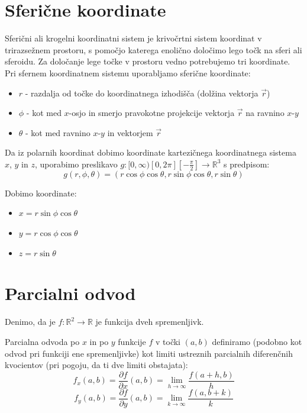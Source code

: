 \documentclass[12pt, a4paper]{article}
\begin{document}
\section{Sferične koordinate}

Sferični ali krogelni koordinatni sistem je krivočrtni sistem koordinat v trirazsežnem prostoru, s pomočjo katerega enolično določimo lego točk na sferi ali sferoidu. Za določanje lege točke v prostoru vedno potrebujemo tri koordinate. Pri sfernem koordinatnem sistemu uporabljamo sferične koordinate:
\begin{itemize}
\item $r$ - razdalja od točke do koordinatnega izhodišča (dolžina vektorja $\vec{r}$)
\item $\phi$ - kot med $x$-osjo in smerjo pravokotne projekcije vektorja $\vec{r}$ na ravnino $x$-$y$
\item $\theta$ - kot med ravnino $x$-$y$ in vektorjem $\vec{r}$
\end{itemize}

Da iz polarnih koordinat dobimo koordinate kartezičnega koordinatnega sistema $x$, $y$ in $z$, uporabimo preslikavo $g:  [ 0,\infty)    [0,2\pi]    [-\frac{\pi}{2}]  \rightarrow \mathbb{R}^3 $ s predpisom:
$$g(r,\phi, \theta) = (r \cos \phi \cos \theta, r \sin \phi \cos \theta, r \sin \theta)$$

Dobimo koordinate:
\begin{itemize}
\item $x=r \sin \phi \cos \theta$
\item $y=r \cos \phi  \cos \theta $
\item $z=r \sin \theta$
\end{itemize}




\section{Parcialni odvod}


Denimo, da je $f : \mathbb{R}^2 \rightarrow \mathbb{R} $ je funkcija dveh spremenljivk.

Parcialna odvoda po $x$ in po $y$ funkcije $f$ v točki $(a, b)$ definiramo (podobno kot odvod pri funkciji ene spremenljivke) kot limiti ustreznih parcialnih diferenčnih kvocientov (pri pogoju, da ti dve limiti obstajata):
$$
f_x(a, b)= \frac{\partial f}{\partial x}(a, b) = \lim_{h\to\infty} \frac{f(a+h, b)}{h}
$$
$$
f_y(a, b)= \frac{\partial f}{\partial y}(a, b) = \lim_{k\to\infty} \frac{f(a, b+k)}{k}
$$
\end{document}
